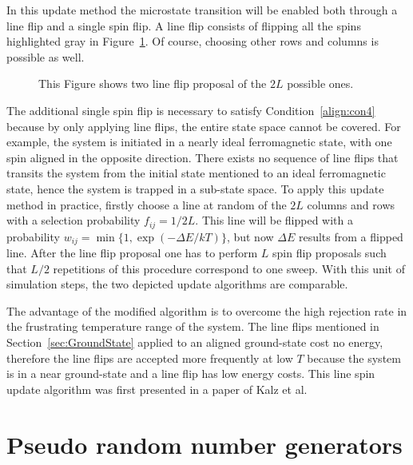 In this update method the microstate transition will be enabled both through a line flip and a single spin flip. A line flip consists of flipping all 
the spins highlighted gray in Figure~\ref{fig:simulation1}. Of course, choosing other rows and columns is possible as well.
\begin{figure}[!h]
    \centering
        
    \caption{This Figure shows two line flip proposal of the $2L$ possible ones.}
    \label{fig:simulation1}
\end{figure}
The additional single spin flip is necessary to satisfy Condition~\eqref{align:con4} because by only applying line flips, the entire state space 
cannot be covered. For example, the system is initiated in a nearly ideal ferromagnetic state, with one spin aligned in the opposite direction. 
There exists no sequence of line flips that transits the system from the initial state mentioned to an ideal ferromagnetic state, hence the system is 
trapped in a sub-state space. To apply this update method in practice, firstly choose a line at random of the $2L$ columns and rows with 
a selection probability $f_{ij}=1/2L$. This line will be flipped with a probability $w_{ij}=\min\{1,\exp(-\Delta E/kT)\}$, but now $\Delta E$ results 
from a flipped line. After the line flip proposal one has to perform $L$ spin flip proposals such that $L/2$ repetitions of this procedure correspond 
to one sweep. With this unit of simulation steps, the two depicted update algorithms are comparable. 

The advantage of the modified algorithm is to overcome the high rejection rate in the frustrating temperature range of the system. The line flips 
mentioned in Section~\ref{sec:GroundState} applied to an aligned ground-state cost no energy, therefore the line flips are accepted more frequently
at low $T$ because the system is in a near ground-state and a line flip has low energy costs. This line spin update 
algorithm was first presented in a paper of Kalz et al.~\cite{Kalz2008}




\section{Pseudo random number generators}

